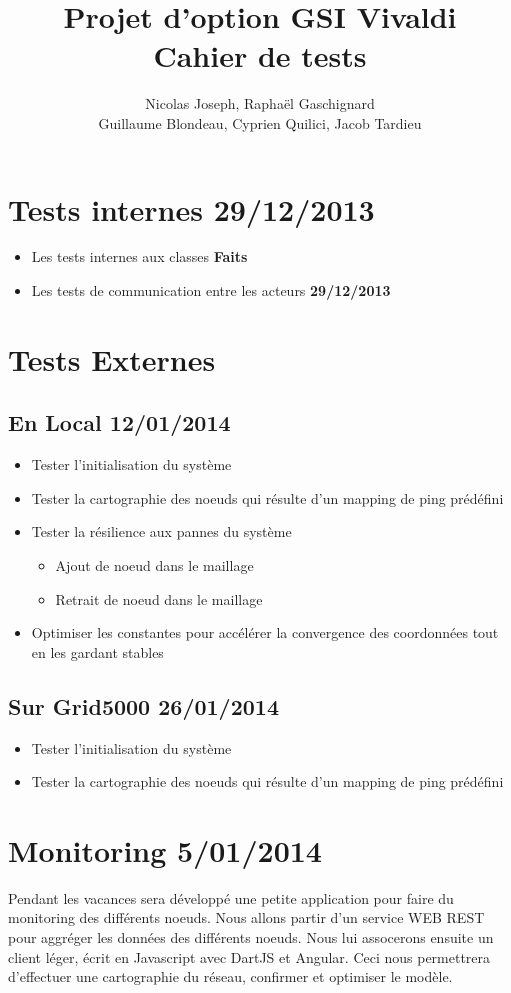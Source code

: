 \documentclass[11pt,a4paper]{article}
\title{Projet d'option GSI Vivaldi \\ Cahier de tests}
\author{Nicolas Joseph, Raphaël Gaschignard\\ Guillaume Blondeau, Cyprien Quilici, Jacob Tardieu}
\begin{document}
\maketitle

\section{Tests internes \hfill 29/12/2013}
\begin{itemize}
\item Les tests internes aux classes  \hfill \textbf{Faits}
\item Les tests de communication entre les acteurs \hfill \textbf{29/12/2013}
\end{itemize}

\section{Tests Externes}
\subsection{En Local \hfill \textbf{12/01/2014}}

\begin{itemize}
\item Tester l’initialisation du système
\item Tester la cartographie des noeuds qui résulte d’un mapping de ping prédéfini
\item Tester la résilience aux pannes du système
\begin{itemize}
\item Ajout de noeud dans le maillage
\item Retrait de noeud dans le maillage
\end{itemize}
\item Optimiser les constantes pour accélérer la convergence des coordonnées tout en les gardant stables
\end{itemize}

\subsection{Sur Grid5000  \hfill \textbf{26/01/2014}}
\begin{itemize}
\item Tester l’initialisation du système
\item Tester la cartographie des noeuds qui résulte d’un mapping de ping prédéfini
\end{itemize}

\section{Monitoring \hfill 5/01/2014}
Pendant les vacances sera développé une petite application pour faire du monitoring des différents noeuds. Nous allons partir d'un service WEB REST pour aggréger les données des différents noeuds. Nous lui assocerons ensuite un client léger, écrit en Javascript avec DartJS et Angular. Ceci nous permettrera d'effectuer une cartographie du réseau, confirmer et optimiser le modèle.
\end{document}
